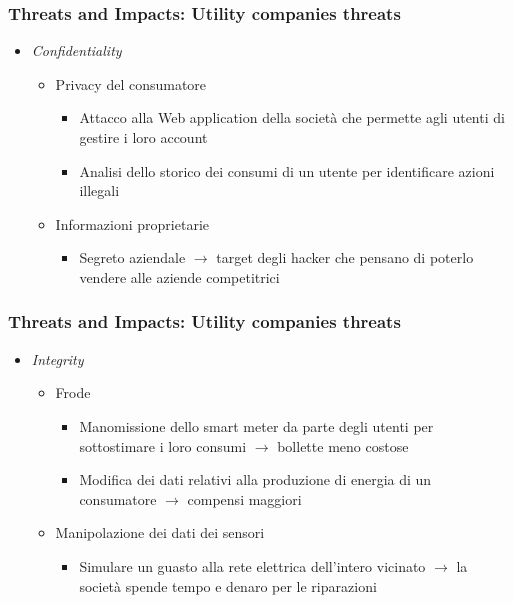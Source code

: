 \begin{frame}
  \frametitle{Threats and Impacts: Utility companies threats}
  \begin{itemize}[<+- | alert@+>]
  \item \textit{Confidentiality}
  \begin{itemize}
	  \item Privacy del consumatore
	  \begin{itemize}
	  \item Attacco alla Web application della società che permette agli utenti di gestire i loro account
	  \item Analisi dello storico dei consumi di un utente per identificare azioni illegali
	  \end{itemize}
	\item Informazioni proprietarie
		\begin{itemize}
		\item Segreto aziendale $\rightarrow$ target degli hacker che pensano di poterlo vendere alle aziende competitrici
		\end{itemize}
 	\end{itemize}
 \end{itemize}
\end{frame}

\begin{frame}
  \frametitle{Threats and Impacts: Utility companies threats}
  \begin{itemize}[<+- | alert@+>]
  \item \textit{Integrity}
  \begin{itemize}
	  \item Frode
	  \begin{itemize}
	  \item Manomissione dello smart meter da parte degli utenti per sottostimare i loro consumi $\rightarrow$ bollette meno costose 
	  \item Modifica dei dati relativi alla produzione di energia di un consumatore $\rightarrow$ compensi maggiori
	  \end{itemize}
	\item Manipolazione dei dati dei sensori
		\begin{itemize}
		\item Simulare un guasto alla rete elettrica dell'intero vicinato $\rightarrow$ la società spende tempo e denaro per le riparazioni
		\end{itemize}
 	\end{itemize}
 \end{itemize}
\end{frame}

